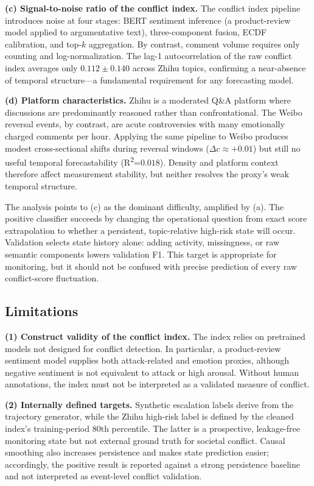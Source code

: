 \documentclass[journal]{IEEEtran}
\begin{document}
\textbf{(c) Signal-to-noise ratio of the conflict index.} The conflict index pipeline introduces noise at four stages: BERT sentiment inference (a product-review model applied to argumentative text), three-component fusion, ECDF calibration, and top-$k$ aggregation. By contrast, comment volume requires only counting and log-normalization. The lag-1 autocorrelation of the raw conflict index averages only $0.112 \pm 0.140$ across Zhihu topics, confirming a near-absence of temporal structure---a fundamental requirement for any forecasting model.

\textbf{(d) Platform characteristics.} Zhihu is a moderated Q\&A platform where discussions are predominantly reasoned rather than confrontational. The Weibo reversal events, by contrast, are acute controversies with many emotionally charged comments per hour. Applying the same pipeline to Weibo produces modest cross-sectional shifts during reversal windows ($\Delta c \approx +0.01$) but still no useful temporal forecastability (R\textsuperscript{2}=$0.018$). Density and platform context therefore affect measurement stability, but neither resolves the proxy's weak temporal structure.

The analysis points to (c) as the dominant difficulty, amplified by (a). The positive classifier succeeds by changing the operational question from exact score extrapolation to whether a persistent, topic-relative high-risk state will occur. Validation selects state history alone: adding activity, missingness, or raw semantic components lowers validation F1. This target is appropriate for monitoring, but it should not be confused with precise prediction of every raw conflict-score fluctuation.

\subsection{Limitations}\label{sec:limitations}

\textbf{(1) Construct validity of the conflict index.} The index relies on pretrained models not designed for conflict detection. In particular, a product-review sentiment model supplies both attack-related and emotion proxies, although negative sentiment is not equivalent to attack or high arousal. Without human annotations, the index must not be interpreted as a validated measure of conflict.

\textbf{(2) Internally defined targets.} Synthetic escalation labels derive from the trajectory generator, while the Zhihu high-risk label is defined by the cleaned index's training-period 80th percentile. The latter is a prospective, leakage-free monitoring state but not external ground truth for societal conflict. Causal smoothing also increases persistence and makes state prediction easier; accordingly, the positive result is reported against a strong persistence baseline and not interpreted as event-level conflict validation.
\end{document}
